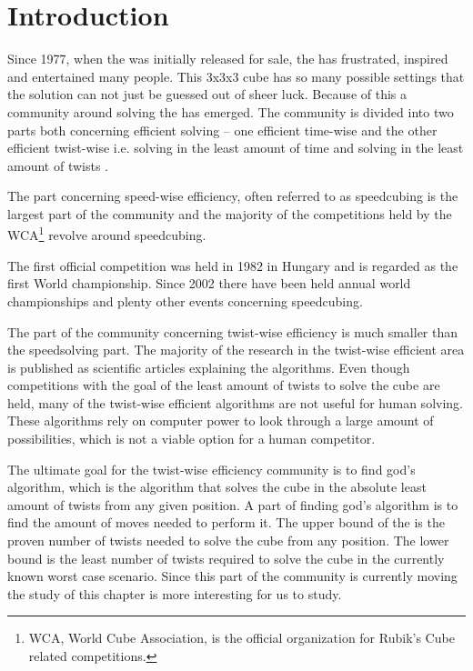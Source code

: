 \chapter{Introduction}
\vspace{-6mm}
Since 1977, when the \rubik{} was initially released for sale, the \rubik{} has frustrated, inspired and entertained many people. This 3x3x3 cube has so many possible settings that the solution can not just be guessed out of sheer luck. Because of this a community around solving the \rubik{} has emerged. The community is divided into two parts both concerning efficient solving -- one efficient time-wise and the other efficient twist-wise i.e. solving in the least amount of time and solving in the least amount of twists \cite{speedsolving.forum}. 

The part concerning speed-wise efficiency, often referred to as speedcubing is the largest part of the community and the majority of the competitions held by the WCA\footnote{WCA, World Cube Association, is the official organization for Rubik's Cube related competitions.} \cite{wca} revolve around speedcubing.

The first official competition was held in 1982 in Hungary and is regarded as the first World championship. Since 2002 there have been held annual world championships and plenty other events concerning speedcubing. 

The part of the community concerning twist-wise efficiency is much smaller than the speedsolving part. The majority of the research in the twist-wise efficient area is published as scientific articles explaining the algorithms. Even though competitions with the goal of the least amount of twists to solve the cube are held, many of the twist-wise efficient algorithms are not useful for human solving. These algorithms rely on computer power to look through a large amount of possibilities, which is not a viable option for a human competitor.


The ultimate goal for the twist-wise efficiency community is to find god's algorithm, which is the algorithm that solves the cube in the absolute least amount of twists from any given position. A part of finding god's algorithm is to find the amount of moves needed to perform it. 
The upper bound of the \rubik{} is the proven number of twists needed to solve the cube from any position. The lower bound is the least number of twists required to solve the cube in the currently known worst case scenario. 
Since this part of the \rubik{} community is currently moving the study of this chapter is more interesting for us to study. 


